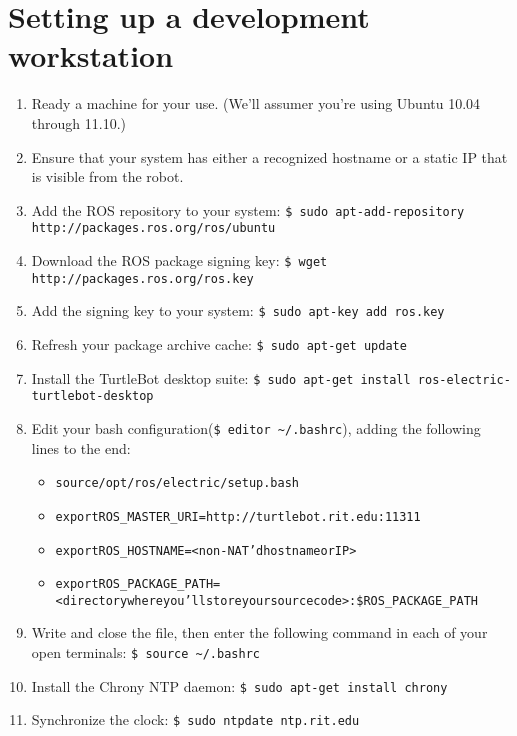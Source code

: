 \documentclass{article}
\begin{document}
\section{Setting up a development workstation}
\begin{enumerate}
\item{Ready a machine for your use.  (We'll assumer you're using Ubuntu 10.04 through 11.10.)}
\item{Ensure that your system has either a recognized hostname or a static IP that is visible from the robot.}
\item{Add the ROS repository to your system: \texttt{\$\ sudo apt-add-repository http://packages.ros.org/ros/ubuntu}}
\item{Download the ROS package signing key: \texttt{\$\ wget http://packages.ros.org/ros.key}}
\item{Add the signing key to your system: \texttt{\$\ sudo apt-key add ros.key}}
\item{Refresh your package archive cache: \texttt{\$\ sudo apt-get update}}
\item{Install the TurtleBot desktop suite: \texttt{\$\ sudo apt-get install ros-electric-turtlebot-desktop}}
\item{Edit your bash configuration(\texttt{\$\ editor \~{}/.bashrc}), adding the following lines to the end:}
\begin{alltt}\begin{itemize}
\item{source /opt/ros/electric/setup.bash}
\item{export ROS_MASTER_URI=http://turtlebot.rit.edu:11311}
\item{export ROS_HOSTNAME=<non-NAT'd hostname or IP>}
\item{export ROS_PACKAGE_PATH=<directory where you'll store your source code>:\$ROS_PACKAGE_PATH}
\end{itemize}\end{alltt}
\item{Write and close the file, then enter the following command in each of your open terminals: \texttt{\$\ source \~{}/.bashrc}}
\item{Install the Chrony NTP daemon: \texttt{\$\ sudo apt-get install chrony}}
\item{Synchronize the clock: \texttt{\$\ sudo ntpdate ntp.rit.edu}}
\end{enumerate}
\end{document}
